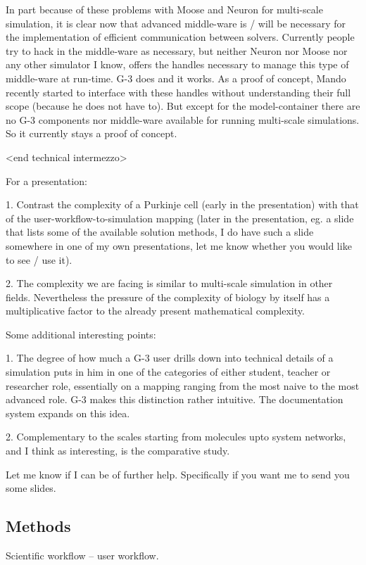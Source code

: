 \documentclass[12pt]{article}
\begin{document}
In part because of these problems with Moose and Neuron for
multi-scale simulation, it is clear now that advanced middle-ware is /
will be necessary for the implementation of efficient communication
between solvers.  Currently people try to hack in the middle-ware as
necessary, but neither Neuron nor Moose nor any other simulator I
know, offers the handles necessary to manage this type of middle-ware
at run-time.  G-3 does and it works.  As a proof of concept, Mando
recently started to interface with these handles without understanding
their full scope (because he does not have to).  But except for the
model-container there are no G-3 components nor middle-ware available
for running multi-scale simulations.  So it currently stays a proof of
concept.

<end technical intermezzo>

For a presentation:

1. Contrast the complexity of a Purkinje cell (early in the
presentation) with that of the user-workflow-to-simulation mapping
(later in the presentation, eg. a slide that lists some of the
available solution methods, I do have such a slide somewhere in one of
my own presentations, let me know whether you would like to see / use
it).

2. The complexity we are facing is similar to multi-scale simulation
in other fields.  Nevertheless the pressure of the complexity of
biology by itself has a multiplicative factor to the already present
mathematical complexity.

Some additional interesting points:

1. The degree of how much a G-3 user drills down into technical
details of a simulation puts in him in one of the categories of either
student, teacher or researcher role, essentially on a mapping ranging
from the most naive to the most advanced role.  G-3 makes this
distinction rather intuitive.  The documentation system expands on
this idea.

2. Complementary to the scales starting from molecules upto system
networks, and I think as interesting, is the comparative study.

Let me know if I can be of further help.  Specifically if you want me
to send you some slides.

\subsection*{Methods}

Scientific workflow -- user workflow.
\end{document}
